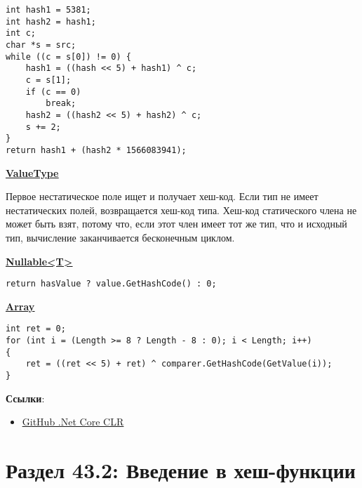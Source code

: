 \begin{tcolorbox}
\begin{verbatim}
int hash1 = 5381;
int hash2 = hash1;
int c;
char *s = src;
while ((c = s[0]) != 0) {
    hash1 = ((hash << 5) + hash1) ^ c;
    c = s[1];
    if (c == 0)
        break;
    hash2 = ((hash2 << 5) + hash2) ^ c;
    s += 2;
}
return hash1 + (hash2 * 1566083941);
\end{verbatim}
\end{tcolorbox}

\href{https://vk.cc/atQv0t}{\underline{\textbf{ValueType}}}

\vspace{\baselineskip}

Первое нестатическое поле ищет и получает хеш-код. Если тип не имеет нестатических полей, возвращается хеш-код типа. Хеш-код статического члена не может быть взят, потому что, если этот член имеет тот же тип, что и исходный тип, вычисление заканчивается бесконечным циклом.

\vspace{\baselineskip}

\href{https://vk.cc/atQv6U}{\underline{\textbf{Nullable<T>}}}

\begin{tcolorbox}
\begin{verbatim}
return hasValue ? value.GetHashCode() : 0;
\end{verbatim}
\end{tcolorbox}

\href{https://vk.cc/atQvdQ}{\underline{\textbf{Array}}}

\begin{tcolorbox}
\begin{verbatim}
int ret = 0;
for (int i = (Length >= 8 ? Length - 8 : 0); i < Length; i++)
{
    ret = ((ret << 5) + ret) ^ comparer.GetHashCode(GetValue(i));
}
\end{verbatim}
\end{tcolorbox}

\textbf{Ссылки}:

\begin{itemize}
    \item \href{https://vk.cc/atQvs1}{\underline{GitHub .Net Core CLR}}
\end{itemize}

\section*{Раздел 43.2: Введение в хеш-функции}

